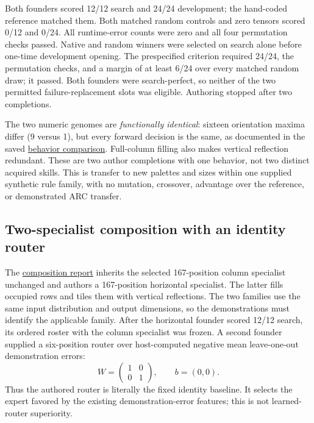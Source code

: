 \documentclass[11pt]{article}
\begin{document}
Both founders scored 12/12 search and 24/24 development; the hand-coded reference matched them.
Both matched random controls and zero tensors scored 0/12 and 0/24. All runtime-error counts
were zero and all four permutation checks passed. Native and random winners were selected on
search alone before one-time development opening. The prespecified criterion required 24/24,
the permutation checks, and a margin of at least 6/24 over every matched random draw; it passed.
Both founders were search-perfect, so neither of the two permitted failure-replacement slots
was eligible. Authoring stopped after two completions.

The two numeric genomes are \emph{functionally identical}: sixteen orientation maxima differ
(9 versus 1), but every forward decision is the same, as documented in the saved
\href{https://github.com/Sanokei/CellForge/blob/02beaf18251fca5ed1f1eb55e92f00a3e3820e88/runs/weights-native-transfer-curriculum01-20261006/HOST_EVALUATION/BEHAVIORAL_COMPARISON.json}{behavior comparison}.
Full-column filling also makes vertical reflection redundant. These are two author completions
with one behavior, not two distinct acquired skills. This is transfer to new palettes and sizes
within one supplied synthetic rule family, with no mutation, crossover, advantage over the
reference, or demonstrated ARC transfer.

\subsection{Two-specialist composition with an identity router}
The \href{https://github.com/Sanokei/CellForge/blob/02beaf18251fca5ed1f1eb55e92f00a3e3820e88/reports/NATIVE_COMPOSITION_RESULT_20261006.md}{composition report}
inherits the selected 167-position column specialist unchanged and authors a 167-position
horizontal specialist. The latter fills occupied rows and tiles them with vertical reflections.
The two families use the same input distribution and output dimensions, so the demonstrations
must identify the applicable family. After the horizontal founder scored 12/12 search, its
ordered roster with the column specialist was frozen. A second founder supplied a six-position
router over host-computed negative mean leave-one-out demonstration errors:
\[
 W=\begin{pmatrix}1&0\\0&1\end{pmatrix},\qquad b=(0,0).
\]
Thus the authored router is literally the fixed identity baseline. It selects the expert favored
by the existing demonstration-error features; this is not learned-router superiority.
\end{document}

